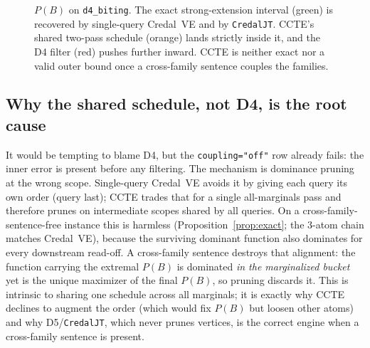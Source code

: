 \documentclass[11pt]{article}
\begin{document}
\begin{figure}[ht]
\centering
{}
\caption{$P(B)$ on \texttt{d4\_biting}. The exact strong-extension interval (green) is
  recovered by single-query Credal~VE and by \texttt{CredalJT}. CCTE's shared two-pass schedule
  (orange) lands strictly inside it, and the D4 filter (red) pushes further inward. CCTE is
  neither exact nor a valid outer bound once a cross-family sentence couples the families.}
\label{fig:dband}
\end{figure}

\subsection{Why the shared schedule, not D4, is the root cause}
It would be tempting to blame D4, but the \texttt{coupling="off"} row already fails: the inner
error is present before any filtering. The mechanism is dominance pruning at the wrong scope.
Single-query Credal~VE avoids it by giving each query its own order (query last); CCTE trades
that for a single all-marginals pass and therefore prunes on intermediate scopes shared by all
queries. On a cross-family-sentence-free instance this is harmless (Proposition~\ref{prop:exact};
the $3$-atom chain matches Credal~VE), because the surviving dominant function also dominates for
every downstream read-off. A cross-family sentence destroys that alignment: the function carrying
the extremal $P(B)$ is dominated \emph{in the marginalized bucket} yet is the unique maximizer of
the final $P(B)$, so pruning discards it. This is intrinsic to sharing one schedule across all
marginals; it is exactly why CCTE declines to augment the order (which would fix $P(B)$ but
loosen other atoms) and why D5/\texttt{CredalJT}, which never prunes vertices, is the correct
engine when a cross-family sentence is present.
\end{document}
